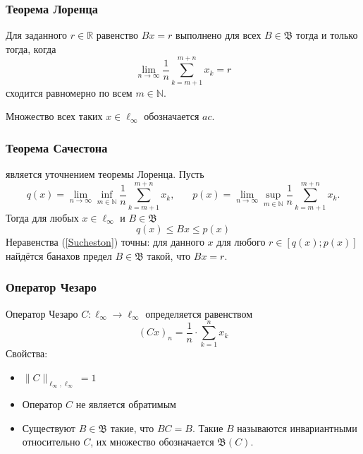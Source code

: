 \documentclass[10pt,pdf,hyperref={unicode},aspectratio=169,color={usenames, dvipsnames}]{beamer}\usepackage{amsmath}
\theoremstyle{definition}
\begin{document}
\begin{frame}\frametitle{Теорема Лоренца}
	Для заданного $r\in\mathbb{R}$ равенство $Bx=r$ выполнено для всех $B\in\mathfrak{B}$
	тогда и только тогда, когда
	\begin{equation*}
		\lim_{n\to\infty} \frac{1}{n} \sum_{k=m+1}^{m+n} x_k = r
	\end{equation*}
	сходится равномерно по всем $m\in\mathbb{N}$.

	Множество всех таких $x \in \ell_\infty$ обозначается $ac$.
\end{frame}

\begin{frame}\frametitle{Теорема Сачестона}
	является уточнением теоремы Лоренца.
	Пусть
	\begin{equation*}
		q(x) = \lim_{n\to\infty} \inf_{m\in\mathbb{N}}  \frac{1}{n} \sum_{k=m+1}^{m+n} x_k,
		~~~~~~~~
		p(x) = \lim_{n\to\infty} \sup_{m\in\mathbb{N}}  \frac{1}{n} \sum_{k=m+1}^{m+n} x_k.
	\end{equation*}
	Тогда для любых $x\in \ell_\infty$ и $B\in\mathfrak{B}$
	\begin{equation}\label{Sucheston}
		q(x) \leqslant Bx \leqslant p(x)
	\end{equation}
	Неравенства (\ref{Sucheston}) точны:
	для данного $x$ для любого $r\in[q(x); p(x)]$ найдётся банахов предел
	$B\in\mathfrak{B}$ такой, что $Bx = r$.
\end{frame}

\begin{frame}\frametitle{Оператор Чезаро}
	Оператор Чезаро $C:\ell_\infty\to \ell_\infty$ определяется равенством
	\begin{equation*}
		(Cx)_n = \frac{1}{n} \cdot \sum_{k=1}^n x_k
	\end{equation*}
	Свойства:
	\begin{itemize}
		\item
			$\|C\|_{\ell_\infty,\ell_\infty} = 1$
		\item
			Оператор $C$ не является обратимым
		\item
			Существуют $B\in\mathfrak{B}$ такие, что $BC=B$.
			Такие $B$ называются инвариантными относительно $C$,
			их множество обозначается $\mathfrak{B}(C)$.
	\end{itemize}
\end{frame}
\end{document}
